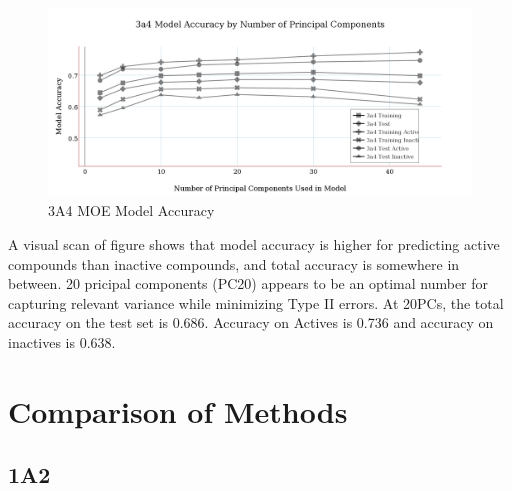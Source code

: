 \begin{figure}[!h]
\includegraphics[width=1\textwidth]{../img/3a4_moe_model_accuracy.png}
\caption{3A4 MOE Model Accuracy}
\end{figure}

A visual scan of figure shows that model accuracy is higher for predicting active compounds than inactive compounds, and total accuracy is somewhere in between. 20 pricipal components (PC20) appears to be an optimal number for capturing relevant variance while minimizing Type II errors. At 20PCs, the total accuracy on the test set is 0.686. Accuracy on Actives is 0.736 and accuracy on inactives is 0.638.

\section{Comparison of Methods}


\subsection{1A2}

